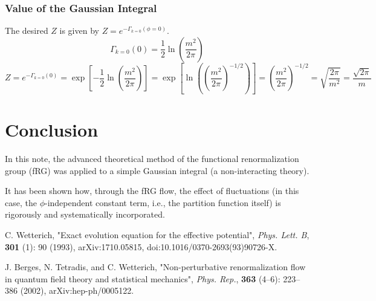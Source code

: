 \documentclass[uplatex,a4j,12pt,dvipdfmx]{jsarticle}
\begin{document}
\subsubsection{Value of the Gaussian Integral}

The desired $Z$ is given by $Z = e^{-\Gamma_{k=0}(\phi=0)}$.
\[
    \Gamma_{k=0}(0) = \frac{1}{2} \ln \left( \frac{m^2}{2\pi} \right)
\]
\[
    Z = e^{-\Gamma_{k=0}(0)} = \exp \left[ -\frac{1}{2} \ln \left( \frac{m^2}{2\pi} \right) \right]
    = \exp \left[ \ln \left( \left(\frac{m^2}{2\pi}\right)^{-1/2} \right) \right]
    = \left( \frac{m^2}{2\pi} \right)^{-1/2}
    = \sqrt{\frac{2\pi}{m^2}}
    = \frac{\sqrt{2\pi}}{m}
\]
\section{Conclusion}

In this note, the advanced theoretical method of the functional renormalization group (fRG)
was applied to a simple Gaussian integral (a non-interacting theory).

It has been shown how, through the fRG flow, the effect of fluctuations
(in this case, the $\phi$-independent constant term, i.e., the partition function itself)
is rigorously and systematically incorporated.

\begin{thebibliography}{9}
    C. Wetterich,
    "Exact evolution equation for the effective potential",
    \textit{Phys. Lett. B}, \textbf{301} (1): 90 (1993),
    arXiv:1710.05815,
    doi:10.1016/0370-2693(93)90726-X.
    
    J. Berges, N. Tetradis, and C. Wetterich,
    "Non-perturbative renormalization flow in quantum field theory and statistical mechanics",
    \textit{Phys. Rep.}, \textbf{363} (4–6): 223–386 (2002),
    arXiv:hep-ph/0005122.
    
\end{thebibliography}
\end{document}
